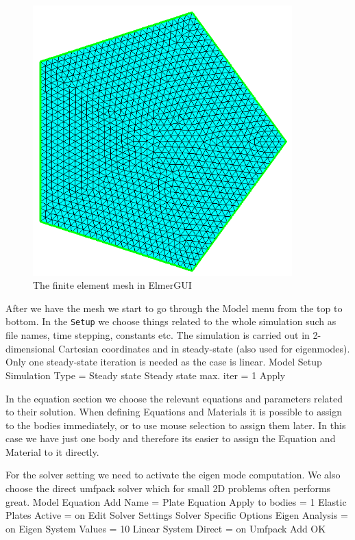 \begin{figure}
\begin{center}
\includegraphics[width=100mm]{mesh}
\caption{The finite element mesh in ElmerGUI}\label{fg:pentagonmesh}
\end{center}
\end{figure}

After we have the mesh we start to go through the Model menu from the top to bottom. 
In the \texttt{Setup} we choose things related to the whole simulation such as file names, 
time stepping, constants etc.
The simulation is carried out in 2-dimensional Cartesian
coordinates and in steady-state (also used for eigenmodes). 
Only one steady-state iteration is needed as the case is linear. 
\ttbegin
Model
  Setup 
    Simulation Type = Steady state
    Steady state max. iter = 1
    Apply
\ttend

In the equation section we choose the relevant equations and parameters related to their solution. 
When defining Equations and Materials it is possible to assign to the bodies immediately, or to use mouse
selection to assign them later. In this case we have just one body and therefore its easier to assign 
the Equation and Material to it directly.

For the solver setting we need to activate the eigen mode computation. We also choose the 
direct umfpack solver which for small 2D problems often performs great.
\ttbegin
Model
  Equation
    Add 
      Name = Plate Equation
      Apply to bodies = 1
      Elastic Plates
        Active = on
        Edit Solver Settings 
          Solver Specific Options
            Eigen Analysis = on
            Eigen System Values = 10
          Linear System
            Direct = on
              Umfpack              
    Add  
    OK
\ttend        

